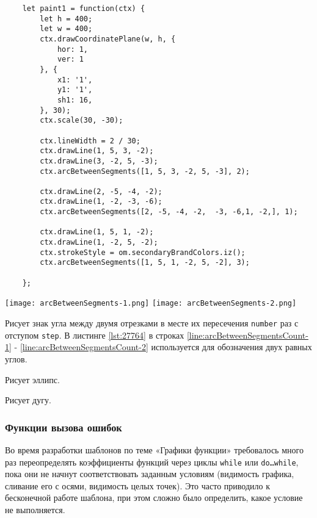 \begin{lstlisting}
    let paint1 = function(ctx) {
        let h = 400;
        let w = 400;
        ctx.drawCoordinatePlane(w, h, {
            hor: 1,
            ver: 1
        }, {
            x1: '1',
            y1: '1',
            sh1: 16,
        }, 30);
        ctx.scale(30, -30);

        ctx.lineWidth = 2 / 30;
        ctx.drawLine(1, 5, 3, -2);
        ctx.drawLine(3, -2, 5, -3);
        ctx.arcBetweenSegments([1, 5, 3, -2, 5, -3], 2);

        ctx.drawLine(2, -5, -4, -2);
        ctx.drawLine(1, -2, -3, -6);
        ctx.arcBetweenSegments([2, -5, -4, -2,  -3, -6,1, -2,], 1);

        ctx.drawLine(1, 5, 1, -2);
		ctx.drawLine(1, -2, 5, -2);
		ctx.strokeStyle = om.secondaryBrandColors.iz();
		ctx.arcBetweenSegments([1, 5, 1, -2, 5, -2], 3);

    };
\end{lstlisting}

\texttt{[image: arcBetweenSegments-1.png]}    
\texttt{[image: arcBetweenSegments-2.png]}    

Рисует знак угла между двумя отрезками в месте их пересечения \texttt{number} раз с отступом \texttt{step}. В листинге \ref{lst:27764} в строках \ref{line:arcBetweenSegmentsCount-1} - \ref{line:arcBetweenSegmentsCount-2} используется для обозначения двух равных углов.

Рисует эллипс.

Рисует дугу.

\subsubsection{Функции вызова ошибок}

Во время разработки шаблонов по теме «Графики функции» требовалось много раз переопределять коэффициенты функций через циклы 
\texttt{while} или \texttt{do\dots while}, пока они не начнут соответствовать заданным условиям (видимость графика, сливание его с осями, видимость целых точек). Это часто приводило к бесконечной работе шаблона, при этом сложно было определить, какое условие не выполняется.

